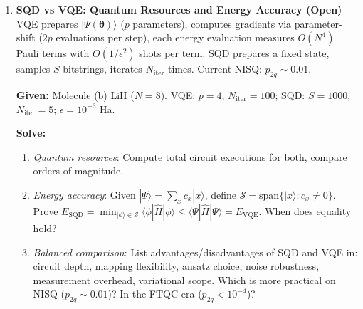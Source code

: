\documentclass[fontset=mac]{ctexart}
\newcommand{\ket}[1]{|#1\rangle}
\newcommand{\bra}[1]{\langle #1|}
\begin{document}
\begin{enumerate}
    \textbf{Given:} Molecule (b) LiH (STO-3G), $\lambda{=}0.05$, $S{=}1000$.

    \textbf{Solve:}
    \begin{enumerate}[label=(\alph*)]
        \item Sample $S{=}1000$ bitstrings from HF and LUCJ ($\lambda{=}0.05$) for LiH, feed into SQD, compare energy accuracy vs.\ FCI.
        \item Explain from quantum information perspective why LUCJ can cover more FCI configurations (key mechanism?), and discuss what $\lambda{=}0$ and $\lambda{=}1$ correspond to. Why use 0.05 instead of 1?
    \end{enumerate}

    \emph{Advanced Challenge:} Is there a quantitative relationship between LUCJ state's entanglement entropy and required samples $S$?

    \textbf{Solution:}
    \begin{enumerate}[label=(\alph*)]
        \item
        \item
    \end{enumerate}

    \item \textbf{SQD vs VQE: Quantum Resources and Energy Accuracy (Open)} \\ VQE prepares $\ket{\Psi(\boldsymbol{\theta})}$ ($p$ parameters), computes gradients via parameter-shift ($2p$ evaluations per step), each energy evaluation measures $O(N^4)$ Pauli terms with $O(1/\epsilon^2)$ shots per term. SQD prepares a fixed state, samples $S$ bitstrings, iterates $N_{\text{iter}}$ times. Current NISQ: $p_{2q}\sim 0.01$.

    \textbf{Given:} Molecule (b) LiH ($N{=}8$). VQE: $p{=}4$, $N_{\text{iter}}{=}100$; SQD: $S{=}1000$, $N_{\text{iter}}{=}5$; $\epsilon{=}10^{-3}$ Ha.

    \textbf{Solve:}
    \begin{enumerate}[label=(\alph*)]
        \item \emph{Quantum resources}: Compute total circuit executions for both, compare orders of magnitude.
        \item \emph{Energy accuracy}: Given $\ket{\Psi} = \sum_x c_x\ket{x}$, define $\mathcal{S}=\text{span}\{\ket{x}:c_x\neq 0\}$. Prove $E_{\text{SQD}} = \min_{\ket{\phi}\in\mathcal{S}}\bra{\phi}\hat{H}\ket{\phi} \leq \bra{\Psi}\hat{H}\ket{\Psi} = E_{\text{VQE}}$. When does equality hold?
        \item \emph{Balanced comparison}: List advantages/disadvantages of SQD and VQE in: circuit depth, mapping flexibility, ansatz choice, noise robustness, measurement overhead, variational scope. Which is more practical on NISQ ($p_{2q}\sim 0.01$)? In the FTQC era ($p_{2q}<10^{-4}$)?
    \end{enumerate}


\end{enumerate}
\end{document}

